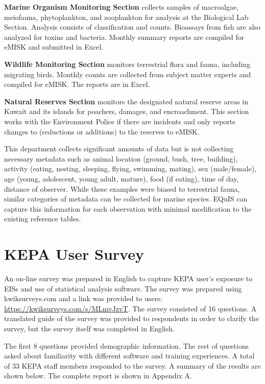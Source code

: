 \textbf{Marine Organism Monitoring Section} collects samples of macroalgae, meiofauna, phytoplankton, and zooplankton for analysis at the Biological Lab Section. Analysis consists of classification and counts. Bioassays from fish are also analyzed for toxins and bacteria. Monthly summary reports are compiled for eMISK and submitted in Excel.

\textbf{Wildlife Monitoring Section} monitors terrestrial flora and fauna, including migrating birds. Monthly counts are collected from subject matter experts and compiled for eMISK. The reports are in Excel.

\textbf{Natural Reserves Section} monitors the designated natural reserve areas in Kuwait and its islands for poachers, damages, and encroachment. This section works with the Environment Police if there are incidents and only reports changes to (reductions or additions) to the reserves to eMISK.

This department collects significant amounts of data but is not collecting necessary metadata such as animal location (ground, bush, tree, building), activity (eating, nesting, sleeping, flying, swimming, mating), sex (male/female), age (young, adolescent, young adult, mature), food (if eating), time of day, distance of observer. While these examples were biased to terrestrial fauna, similar categories of metadata can be collected for marine species. EQuIS can capture this information for each observation with minimal modification to the existing reference tables.


\section{KEPA User Survey}
An on-line survey was prepared in English to capture KEPA user's exposure to EISs and use of statistical analysis software. The survey was prepared using kwiksurveys.com and a link was provided to users: \url{https://kwiksurveys.com/s/MLmvJzvT}. The survey consisted of 16 questions. A translated guide of the survey was provided to respondents in order to clarify the survey, but the survey itself was completed in English.

The first 8 questions provided demographic information. The rest of questions asked about familiarity with different software and training experiences.  A total of 33  KEPA staff members responded to the survey. A summary of the results are shown below. The complete report is shown in Appendix A.

